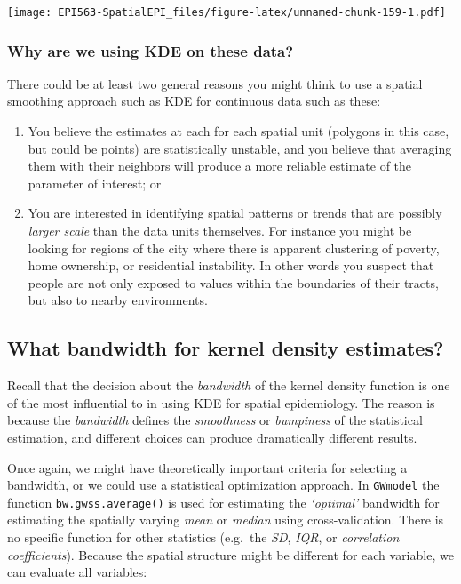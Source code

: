 \documentclass[
]{book}
\newcommand{\passthrough}[1]{#1}
\providecommand{\tightlist}{%
  \setlength{\itemsep}{0pt}\setlength{\parskip}{0pt}}
\begin{document}
\texttt{[image: EPI563-SpatialEPI\_files/figure-latex/unnamed-chunk-159-1.pdf]}

\hypertarget{why-are-we-using-kde-on-these-data}{%
\subsubsection{Why are we using KDE on these data?}\label{why-are-we-using-kde-on-these-data}}

There could be at least two general reasons you might think to use a spatial smoothing approach such as KDE for continuous data such as these:

\begin{enumerate}
\def\labelenumi{\arabic{enumi}.}
\tightlist
\item
  You believe the estimates at each for each spatial unit (polygons in this case, but could be points) are statistically unstable, and you believe that averaging them with their neighbors will produce a more reliable estimate of the parameter of interest; or
\item
  You are interested in identifying spatial patterns or trends that are possibly \emph{larger scale} than the data units themselves. For instance you might be looking for regions of the city where there is apparent clustering of poverty, home ownership, or residential instability. In other words you suspect that people are not only exposed to values within the boundaries of their tracts, but also to nearby environments.
\end{enumerate}

\hypertarget{what-bandwidth-for-kernel-density-estimates}{%
\subsection{What bandwidth for kernel density estimates?}\label{what-bandwidth-for-kernel-density-estimates}}

Recall that the decision about the \emph{bandwidth} of the kernel density function is one of the most influential to in using KDE for spatial epidemiology. The reason is because the \emph{bandwidth} defines the \emph{smoothness} or \emph{bumpiness} of the statistical estimation, and different choices can produce dramatically different results.

Once again, we might have theoretically important criteria for selecting a bandwidth, or we could use a statistical optimization approach. In \passthrough{\lstinline!GWmodel!} the function \passthrough{\lstinline!bw.gwss.average()!} is used for estimating the \emph{`optimal'} bandwidth for estimating the spatially varying \emph{mean} or \emph{median} using cross-validation. There is no specific function for other statistics (e.g.~the \emph{SD}, \emph{IQR}, or \emph{correlation coefficients}). Because the spatial structure might be different for each variable, we can evaluate all variables:
\end{document}
